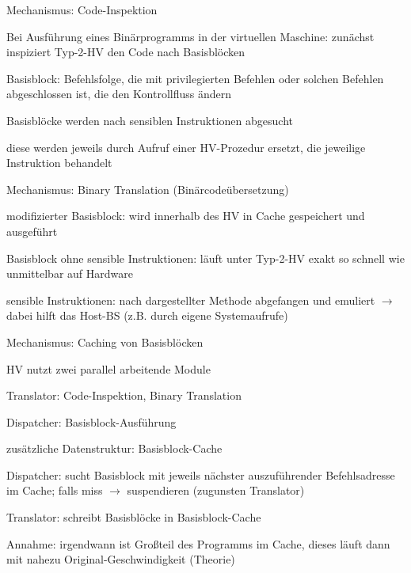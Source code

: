 \documentclass[a4paper]{article}
\begin{document}
\begin{multicols}{3}
    Mechanismus: Code-Inspektion
    \begin{itemize*}
        \item Bei Ausführung eines Binärprogramms in der virtuellen Maschine: zunächst inspiziert Typ-2-HV den Code nach Basisblöcken
        \item Basisblock: Befehlsfolge, die mit privilegierten Befehlen oder solchen Befehlen abgeschlossen ist, die den Kontrollfluss ändern%
        \item Basisblöcke werden nach sensiblen Instruktionen abgesucht
        \item diese werden jeweils durch Aufruf einer HV-Prozedur ersetzt, die jeweilige Instruktion behandelt
    \end{itemize*}

    Mechanismus: Binary Translation (Binärcodeübersetzung)
    \begin{itemize*}
        \item modifizierter Basisblock: wird innerhalb des HV in Cache gespeichert und ausgeführt
        \item Basisblock ohne sensible Instruktionen: läuft unter Typ-2-HV exakt so schnell wie unmittelbar auf Hardware %
        \item sensible Instruktionen: nach dargestellter Methode abgefangen und emuliert $\rightarrow$ dabei hilft das Host-BS (z.B. durch eigene Systemaufrufe) %
    \end{itemize*}

    Mechanismus: Caching von Basisblöcken
    \begin{itemize*}
        \item HV nutzt zwei parallel arbeitende Module
        \begin{itemize*}
            \item Translator: Code-Inspektion, Binary Translation
            \item Dispatcher: Basisblock-Ausführung
        \end{itemize*}
        \item zusätzliche Datenstruktur: Basisblock-Cache
        \item Dispatcher: sucht Basisblock mit jeweils nächster auszuführender
        Befehlsadresse im Cache; falls miss $\rightarrow$
        suspendieren (zugunsten Translator)
        \item Translator: schreibt Basisblöcke in Basisblock-Cache
        \item Annahme: irgendwann ist Großteil des Programms im Cache, dieses läuft dann mit nahezu Original-Geschwindigkeit (Theorie)
    \end{itemize*}


\end{multicols}
\end{document}
